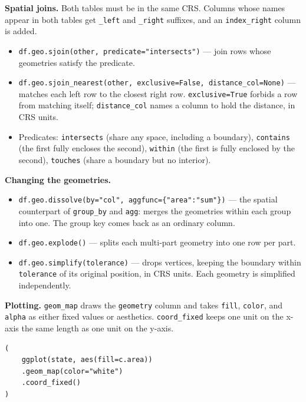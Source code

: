 \documentclass[11pt, a4paper]{article}
\newcommand{\code}[1]{\texttt{#1}}
\begin{document}
\smallskip

\textbf{Spatial joins.}
Both tables must be in the same CRS. Columns whose names appear in both tables get
\code{\_left} and \code{\_right} suffixes, and an \code{index\_right} column is added.

\begin{itemize}
  \item \code{df.geo.sjoin(other, predicate="intersects")} --- join rows whose geometries
        satisfy the predicate.
  \item \code{df.geo.sjoin\_nearest(other, exclusive=False, distance\_col=None)} --- matches
        each left row to the closest right row. \code{exclusive=True} forbids a row from
        matching itself; \code{distance\_col} names a column to hold the distance, in CRS
        units.
  \item Predicates: \code{intersects} (share any space, including a boundary),
        \code{contains} (the first fully encloses the second), \code{within} (the first is
        fully enclosed by the second), \code{touches} (share a boundary but no interior).
\end{itemize}

\smallskip

\textbf{Changing the geometries.}

\begin{itemize}
  \item \code{df.geo.dissolve(by="col", aggfunc=\{"area":"sum"\})} --- the spatial
        counterpart of \code{group\_by} and \code{agg}: merges the geometries within each
        group into one. The group key comes back as an ordinary column.
  \item \code{df.geo.explode()} --- splits each multi-part geometry into one row per part.
  \item \code{df.geo.simplify(tolerance)} --- drops vertices, keeping the boundary within
        \code{tolerance} of its original position, in CRS units. Each geometry is
        simplified independently.
\end{itemize}

\smallskip

\textbf{Plotting.}
\code{geom\_map} draws the \code{geometry} column and takes \code{fill}, \code{color}, and
\code{alpha} as either fixed values or aesthetics. \code{coord\_fixed} keeps one unit on the
x-axis the same length as one unit on the y-axis.

\begin{verbatim}
(
    ggplot(state, aes(fill=c.area))
    .geom_map(color="white")
    .coord_fixed()
)
\end{verbatim}
\end{document}
